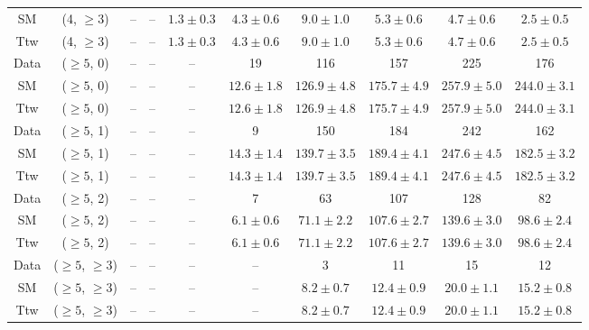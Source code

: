 \begin{table}[h!]
{\begin{tabular}{cccccccccc}
	SM & (4, $\ge3$) & -- & -- & $1.3\pm 0.3$ & $4.3\pm 0.6$ & $9.0\pm 1.0$ & $5.3\pm 0.6$ & $4.7\pm 0.6$ & $2.5\pm 0.5$ \\[0.5ex] 
	Ttw & (4, $\ge3$) & -- & -- & $1.3\pm 0.3$ & $4.3\pm 0.6$ & $9.0\pm 1.0$ & $5.3\pm 0.6$ & $4.7\pm 0.6$ & $2.5\pm 0.5$ \\[0.5ex] 
	Data & ($\ge5$, 0) & -- & -- & -- & 19 & 116 & 157 & 225 & 176 \\[0.5ex] 
	SM & ($\ge5$, 0) & -- & -- & -- & $12.6\pm 1.8$ & $126.9\pm 4.8$ & $175.7\pm 4.9$ & $257.9\pm 5.0$ & $244.0\pm 3.1$ \\[0.5ex] 
	Ttw & ($\ge5$, 0) & -- & -- & -- & $12.6\pm 1.8$ & $126.9\pm 4.8$ & $175.7\pm 4.9$ & $257.9\pm 5.0$ & $244.0\pm 3.1$ \\[0.5ex] 
	Data & ($\ge5$, 1) & -- & -- & -- & 9 & 150 & 184 & 242 & 162 \\[0.5ex] 
	SM & ($\ge5$, 1) & -- & -- & -- & $14.3\pm 1.4$ & $139.7\pm 3.5$ & $189.4\pm 4.1$ & $247.6\pm 4.5$ & $182.5\pm 3.2$ \\[0.5ex] 
	Ttw & ($\ge5$, 1) & -- & -- & -- & $14.3\pm 1.4$ & $139.7\pm 3.5$ & $189.4\pm 4.1$ & $247.6\pm 4.5$ & $182.5\pm 3.2$ \\[0.5ex] 
	Data & ($\ge5$, 2) & -- & -- & -- & 7 & 63 & 107 & 128 & 82 \\[0.5ex] 
	SM & ($\ge5$, 2) & -- & -- & -- & $6.1\pm 0.6$ & $71.1\pm 2.2$ & $107.6\pm 2.7$ & $139.6\pm 3.0$ & $98.6\pm 2.4$ \\[0.5ex] 
	Ttw & ($\ge5$, 2) & -- & -- & -- & $6.1\pm 0.6$ & $71.1\pm 2.2$ & $107.6\pm 2.7$ & $139.6\pm 3.0$ & $98.6\pm 2.4$ \\[0.5ex] 
	Data & ($\ge5$, $\ge3$) & -- & -- & -- & -- & 3 & 11 & 15 & 12 \\[0.5ex] 
	SM & ($\ge5$, $\ge3$) & -- & -- & -- & -- & $8.2\pm 0.7$ & $12.4\pm 0.9$ & $20.0\pm 1.1$ & $15.2\pm 0.8$ \\[0.5ex] 
	Ttw & ($\ge5$, $\ge3$) & -- & -- & -- & -- & $8.2\pm 0.7$ & $12.4\pm 0.9$ & $20.0\pm 1.1$ & $15.2\pm 0.8$ \\[0.5ex] 
	\hline
	\hline
\end{tabular}}
\end{table}
